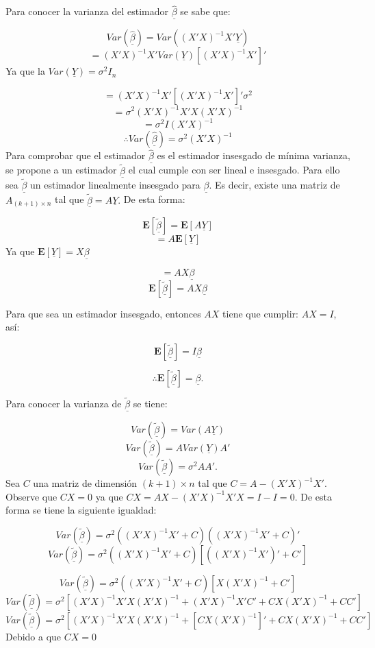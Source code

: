 \documentclass[a4paper,oneside,openany]{book}
\begin{document}
Para conocer la varianza del estimador \(\underline{\hat{\beta}}\) se
sabe que:

\[Var(\underline{\hat{\beta}})=Var\left( (X'X)^{-1}X'\underline{Y}\right)\]
\[=(X'X)^{-1}X'Var(\underline{Y})[(X'X)^{-1}X']'\] Ya que la
\(Var(\underline{Y})=\sigma^2I_{n}\)

\[=(X'X)^{-1}X'[(X'X)^{-1}X']'\sigma^2\]
\[=\sigma^2(X'X)^{-1}X'X(X'X)^{-1}\] \[=\sigma^2I(X'X)^{-1}\]
\[\therefore Var(\underline{\hat{\beta}})=\sigma^2(X'X)^{-1}\] Para
comprobar que el estimador \(\underline{\hat{\beta}}\) es el estimador
insesgado de mínima varianza, se propone a un estimador
\(\underline{\tilde{\beta}}\) el cual cumple con ser lineal e insesgado.
Para ello sea \(\underline{\tilde{\beta}}\) un estimador linealmente
insesgado para \(\underline{\beta}\). Es decir, existe una matriz de
\(A_{(k+1)\times n}\) tal que
\(\underline{\tilde{\beta}}=A \underline{Y}.\) De esta forma:

\[\mathbf{E}\left[\underline{\tilde{\beta}}\right]=\mathbf{E}\left[ A\underline{Y} \right]\]
\[=A \mathbf{E}[\underline{Y}]\] Ya que
\(\mathbf{E}[\underline{Y}]=X\underline{\beta}\)

\[=AX\underline{\beta}\]
\[\mathbf{E}\left[\underline{\tilde{\beta}}\right]=AX\underline{\beta}\]

Para que sea un estimador insesgado, entonces \(AX\) tiene que cumplir:
\(AX=I\), así:

\[\mathbf{E}\left[\underline{\tilde{\beta}}\right]=I\underline{\beta}\]

\[\therefore \mathbf{E}\left[\underline{\tilde{\beta}}\right]=\underline{\beta}.\]

Para conocer la varianza de \(\underline{\tilde{\beta}}\) se tiene:

\[Var\left(\underline{\tilde{\beta}}\right)= Var(A\underline{Y})\]
\[Var\left(\underline{\tilde{\beta}}\right)=A Var(\underline{Y})A'\]
\[Var\left(\underline{\tilde{\beta}}\right)=\sigma^2 AA'.\] Sea \(C\)
una matriz de dimensión \((k+1) \times n\) tal que \(C=A-(X'X)^{-1}X'\).
Observe que \(CX=0\) ya que \(CX=AX-(X'X)^{-1}X'X=I-I=0.\) De esta forma
se tiene la siguiente igualdad:

\[Var\left(\underline{\tilde{\beta}}\right)=\sigma^2((X'X)^{-1}X'+C)((X'X)^{-1}X'+C)'\]
\[Var\left(\underline{\tilde{\beta}}\right)=\sigma^2((X'X)^{-1}X'+C)\left[ ((X'X)^{-1}X')'+C'\right]\]

\[Var\left(\underline{\tilde{\beta}}\right)=\sigma^2((X'X)^{-1}X'+C)[X(X'X)^{-1}+C']\]
\[Var\left(\underline{\tilde{\beta}}\right)=\sigma^2[(X'X)^{-1}X'X(X'X)^{-1}+(X'X)^{-1}X'C'+CX(X'X)^{-1}+CC']\]
\[Var\left(\underline{\tilde{\beta}}\right)=\sigma^2\left[(X'X)^{-1}X'X(X'X)^{-1}+[CX(X'X)^{-1}]'+CX(X'X)^{-1}+CC'\right]\]
Debido a que \(CX=0\)
\end{document}
